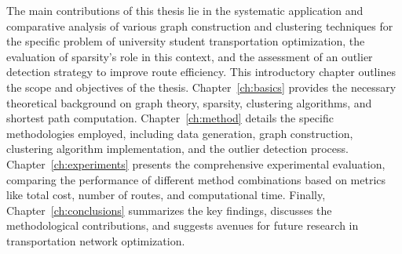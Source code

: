 The main contributions of this thesis lie in the systematic application and comparative analysis of various graph construction and clustering techniques for the specific problem of university student transportation optimization, the evaluation of sparsity's role in this context, and the assessment of an outlier detection strategy to improve route efficiency. This introductory chapter outlines the scope and objectives of the thesis. Chapter~\ref{ch:basics} provides the necessary theoretical background on graph theory, sparsity, clustering algorithms, and shortest path computation. Chapter~\ref{ch:method} details the specific methodologies employed, including data generation, graph construction, clustering algorithm implementation, and the outlier detection process. Chapter~\ref{ch:experiments} presents the comprehensive experimental evaluation, comparing the performance of different method combinations based on metrics like total cost, number of routes, and computational time. Finally, Chapter~\ref{ch:conclusions} summarizes the key findings, discusses the methodological contributions, and suggests avenues for future research in transportation network optimization.




